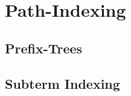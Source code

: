 
\section{Path-Indexing}
\subsection{Prefix-Trees}
\begin{frame}
%	
\end{frame}

\subsection{Subterm Indexing}
\begin{frame}
%	
\end{frame}


